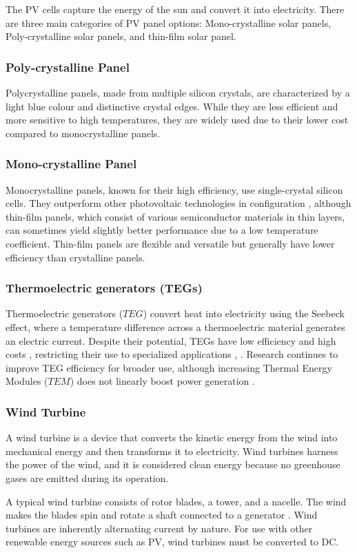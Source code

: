 The PV cells capture the energy of the sun and convert it into electricity. There are three main categories of PV panel options: Mono-crystalline solar panels, Poly-crystalline solar panels, and thin-film solar panel.
\subsubsection{Poly-crystalline Panel}
Polycrystalline panels, made from multiple silicon crystals, are characterized by a light blue colour and distinctive crystal edges. While they are less efficient and more sensitive to high temperatures, they are widely used due to their lower cost compared to monocrystalline panels. 

\subsubsection{Mono-crystalline Panel}
Monocrystalline panels, known for their high efficiency, use single-crystal silicon cells. They outperform other photovoltaic technologies in configuration \cite{Osama2022}, although thin-film panels, which consist of various semiconductor materials in thin layers, can sometimes yield slightly better performance due to a low temperature coefficient. Thin-film panels are flexible and versatile but generally have lower efficiency than crystalline panels.

\subsubsection{Thermoelectric generators (TEGs)} 
Thermoelectric generators ($TEG$) convert heat into electricity using the Seebeck effect, where a temperature difference across a thermoelectric material generates an electric current. Despite their potential, TEGs have low efficiency and high costs \cite{Ma2017}, restricting their use to specialized applications  \cite{Padmavathi2013}, \cite{Marion2005}. Research continues to improve TEG efficiency for broader use, although increasing Thermal Energy Modules ($TEM$) does not linearly boost power generation \cite{Tabaie2023}.
\subsubsection{Wind Turbine} 
A wind turbine is a device that converts the kinetic energy from the wind into mechanical energy and then transforms it to electricity. Wind turbines harness the power of the wind, and it is considered clean energy because no greenhouse gases are emitted during its operation. \par
A typical wind turbine consists of rotor blades, a tower, and a nacelle. The wind makes the blades spin and rotate a shaft connected to a generator \cite{Azadani2023}. Wind turbines are inherently alternating current by nature. For use with other renewable energy sources such as PV, wind turbines must be converted to DC.
